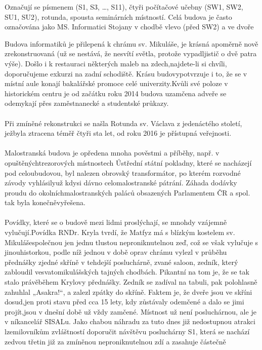 {Označují se písmenem  (S1, S3, \dots, S11), čtyři počítačové učebny (SW1,
SW2, SU1, SU2), rotunda, spousta seminárních místností. Celá budova je často
označována jako MS.}
{Informatici}
{Stojany v chodbě vlevo (před SW2) a ve dvoře}

\noindent Budova informatiků je přilepená k chrámu sv. Mikuláše, je krásná
apoměrně nově zrekonstruovaná (už se nestává, že nesvítí světla, protože
vypadljistič o dvě patra výše). Došlo i k restauraci některých maleb na
zdech,najdete-li si chvíli, doporučujeme exkurzi na zadní schodiště. Krásu
budovypotvrzuje i to, že se v místní aule konají bakalářské promoce celé
univerzity.Kvůli své poloze v historickém centru je od začátku roku 2014 budova
uzamčena adveře se odemykají přes zaměstnanecké a studentské průkazy.
\\\\
Při zmíněné rekonstrukci se našla Rotunda sv. Václava z jedenáctého století,
ježbyla ztracena téměř čtyři sta let, od roku 2016 je přístupná veřejnosti.
\\\\
Malostranská budova je opředena mnoha pověstmi a příběhy, např. v
opuštěnýchtrezorových místnostech Ústřední státní pokladny, které se nacházejí
pod celoubudovou, byl nalezen obrovský transformátor, po kterém rozvodné závody
vyhlásilyuž kdysi dávno celomalostranské pátrání. Záhada dodávky proudu do
okolníchmalostranských paláců obsazených Parlamentem ČR a spol. tak byla
konečněvyřešena.
\\\\
Povídky, které se o budově mezi lidmi proslýchají, se mnohdy vzájemně
vylučují.Povídka RNDr. Kryla tvrdí, že Matfyz má s blízkým kostelem sv.
Mikulášespolečnou jen jednu tlustou neproniknutelnou zeď, což se však vylučuje s
jinouhistorkou, podle níž jednou v době oprav chrámu vylezl v průběhu přednášky
zjedné skříně v tehdejší posluchárně, zvané saloon, zedník, který zabloudil
vesvatomikulášských tajných chodbách. Pikantní na tom je, že se tak stalo
právěběhem Krylovy přednášky. Zedník se zadíval na tabuli, pak polohlasně
zahuhlal „Asakra!“, a zalezl zpátky do skříně. Faktem je, že dveře jsou ve
skříni dosud,jen proti stavu před cca 15 lety, kdy zůstávaly odemčené a dalo se
jimi projít,jsou v dnešní době už vždy zamčené. Místnost už není posluchárnou,
ale je v níkancelář SISALu. Jako chabou náhradu za tuto dnes již nedostupnou
atrakci lzemilovníkům zvláštností doporučit návštěvu posluchárny S1, která se
nachází zedvou třetin již za zmíněnou neproniknutelnou zdí a zasahuje částečně
